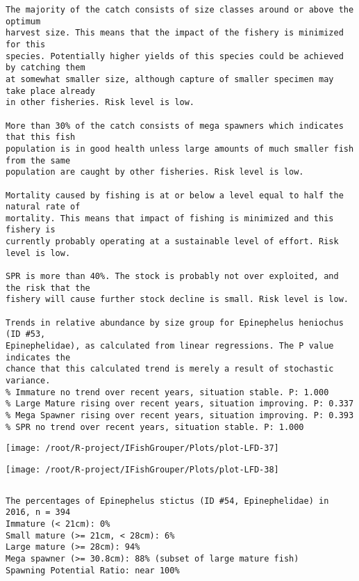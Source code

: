 \documentclass{report}\usepackage[]{graphicx}\usepackage[]{color}
\makeatletter
\def\maxwidth{ %
  \ifdim\Gin@nat@width>\linewidth
    \linewidth
  \else
    \Gin@nat@width
  \fi
}
\newenvironment{kframe}{%
 \def\at@end@of@kframe{}%
 \ifinner\ifhmode%
  \def\at@end@of@kframe{\end{minipage}}%
  \begin{minipage}{\columnwidth}%
 \fi\fi%
 \def\FrameCommand##1{\hskip\@totalleftmargin \hskip-\fboxsep
 \colorbox{shadecolor}{##1}\hskip-\fboxsep
     \hskip-\linewidth \hskip-\@totalleftmargin \hskip\columnwidth}%
 \MakeFramed {\advance\hsize-\width
   \@totalleftmargin\z@ \linewidth\hsize
   \@setminipage}}%
 {\par\unskip\endMakeFramed%
 \at@end@of@kframe}
\newenvironment{knitrout}{}{} %
\makeatother
\begin{document}
\begin{knitrout}
\begin{kframe}
\begin{verbatim}
The majority of the catch consists of size classes around or above the optimum
harvest size. This means that the impact of the fishery is minimized for this
species. Potentially higher yields of this species could be achieved by catching them
at somewhat smaller size, although capture of smaller specimen may take place already
in other fisheries. Risk level is low.

More than 30% of the catch consists of mega spawners which indicates that this fish
population is in good health unless large amounts of much smaller fish from the same
population are caught by other fisheries. Risk level is low.
 
Mortality caused by fishing is at or below a level equal to half the natural rate of
mortality. This means that impact of fishing is minimized and this fishery is
currently probably operating at a sustainable level of effort. Risk level is low.
 
SPR is more than 40%. The stock is probably not over exploited, and the risk that the
fishery will cause further stock decline is small. Risk level is low.
 
Trends in relative abundance by size group for Epinephelus heniochus (ID #53,
Epinephelidae), as calculated from linear regressions. The P value indicates the
chance that this calculated trend is merely a result of stochastic variance.
% Immature no trend over recent years, situation stable. P: 1.000
% Large Mature rising over recent years, situation improving. P: 0.337
% Mega Spawner rising over recent years, situation improving. P: 0.393
% SPR no trend over recent years, situation stable. P: 1.000
\end{verbatim}
\end{kframe}
\texttt{[image: /root/R-project/IFishGrouper/Plots/plot-LFD-37]} 

\texttt{[image: /root/R-project/IFishGrouper/Plots/plot-LFD-38]} 
\begin{kframe}\begin{verbatim}
\end{verbatim}
\end{kframe}
\clearpage
\newpage
\begin{kframe}\begin{verbatim}The percentages of Epinephelus stictus (ID #54, Epinephelidae) in 2016, n = 394
Immature (< 21cm): 0%
Small mature (>= 21cm, < 28cm): 6%
Large mature (>= 28cm): 94%
Mega spawner (>= 30.8cm): 88% (subset of large mature fish)
Spawning Potential Ratio: near 100%
 

\end{verbatim}
\end{kframe}
\end{knitrout}
\end{document}
